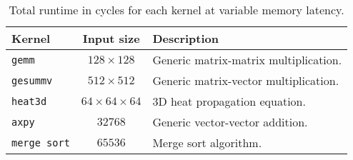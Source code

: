 \begin{table}[t!]
    \caption{Total runtime in cycles for each kernel at variable memory latency.}
    \begin{center}
    \begin{tabular}{lcl}
    
        \toprule
        
        \textbf{Kernel} & \textbf{Input size} & \textbf{Description} \\  
                
        \midrule
        \texttt{gemm} & $128\times128$ &  Generic matrix-matrix multiplication. \\

        \texttt{gesummv} & $512\times512$ & Generic matrix-vector multiplication. \\
    
        \texttt{heat3d} & $64\times64\times64$ &  3D heat propagation equation. \\

        \texttt{axpy} & $32768$ &  Generic vector-vector addition. \\
        
        \texttt{merge sort} & $65536$ &  Merge sort algorithm. \\
    
        \bottomrule
    
    \end{tabular}
    \label{tab:kern_desc}
    \end{center}
    \vspace{-2em}
\end{table}
